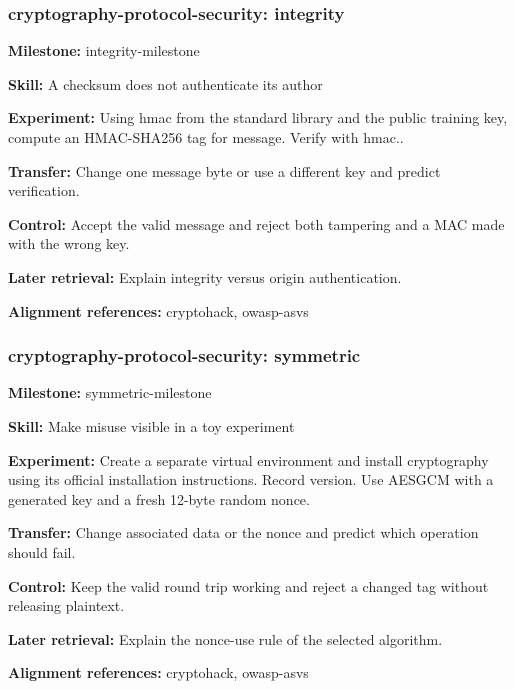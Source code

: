 \subsubsection{cryptography-protocol-security: integrity}
\noindent\textbf{Milestone:} integrity-milestone\par
\noindent\textbf{Skill:} A checksum does not authenticate its author\par
\noindent\textbf{Experiment:} Using hmac from the standard library and the public training key, compute an HMAC-SHA256 tag for message. Verify with hmac..\par
\noindent\textbf{Transfer:} Change one message byte or use a different key and predict verification.\par
\noindent\textbf{Control:} Accept the valid message and reject both tampering and a MAC made with the wrong key.\par
\noindent\textbf{Later retrieval:} Explain integrity versus origin authentication.\par
\noindent\textbf{Alignment references:} cryptohack, owasp-asvs\par
\subsubsection{cryptography-protocol-security: symmetric}
\noindent\textbf{Milestone:} symmetric-milestone\par
\noindent\textbf{Skill:} Make misuse visible in a toy experiment\par
\noindent\textbf{Experiment:} Create a separate virtual environment and install cryptography using its official installation instructions. Record version. Use AESGCM with a generated key and a fresh 12-byte random nonce.\par
\noindent\textbf{Transfer:} Change associated data or the nonce and predict which operation should fail.\par
\noindent\textbf{Control:} Keep the valid round trip working and reject a changed tag without releasing plaintext.\par
\noindent\textbf{Later retrieval:} Explain the nonce-use rule of the selected algorithm.\par
\noindent\textbf{Alignment references:} cryptohack, owasp-asvs\par
